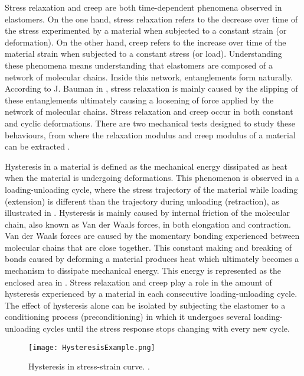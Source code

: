 Stress relaxation and creep are both time-dependent phenomena observed in elastomers. On the one hand, stress relaxation refers to the decrease over time of the stress experimented by a material when subjected to a constant strain (or deformation). On the other hand, creep refers to the increase over time of the material strain when subjected to a constant stress (or load). Understanding these phenomena means understanding that elastomers are composed of a network of molecular chains. Inside this network, entanglements form naturally. According to J. Bauman in \cite{Bauman2008}, stress relaxation is mainly caused by the slipping of these entanglements ultimately causing a loosening of force applied by the network of molecular chains. Stress relaxation and creep occur in both constant and cyclic deformations. There are two mechanical tests designed to study these behaviours, from where the relaxation modulus and creep modulus of a material can be extracted \cite{oberg2016}. 

Hysteresis in a material is defined as the mechanical energy dissipated as heat when the material is undergoing deformations. This phenomenon is observed in a loading-unloading cycle, where the stress trajectory of the material while loading (extension) is different than the trajectory during unloading (retraction), as illustrated in . Hysteresis is mainly caused by internal friction of the molecular chain, also known as Van der Waals forces, in both elongation and contraction. Van der Waals forces are caused by the momentary bonding experienced between molecular chains that are close together. This constant making and breaking of bonds caused by deforming a material produces heat which ultimately becomes a mechanism to dissipate mechanical energy. This energy is represented as the enclosed area in . Stress relaxation and creep play a role in the amount of hysteresis experienced by a material in each consecutive loading-unloading cycle. The effect of hysteresis alone can be isolated by subjecting the elastomer to a conditioning process (preconditioning) in which it undergoes several loading-unloading cycles until the stress response stops changing with every new cycle.

\begin{figure}[htb!]
    \centering
    \texttt{[image: HysteresisExample.png]}
    \caption{Hysteresis in stress-strain curve. \cite{Bauman2008}.}
    \label{fig:hysteresis}
\end{figure}

